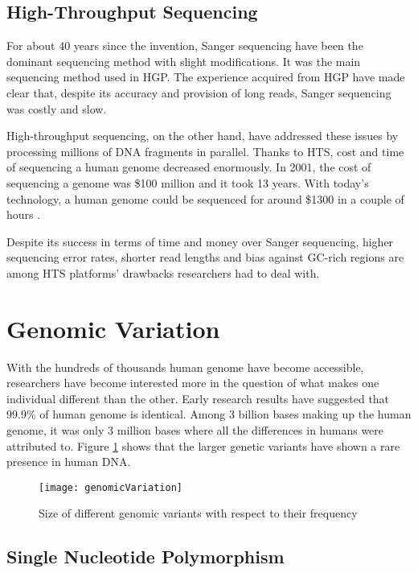 \subsection{High-Throughput Sequencing}
For about 40 years since the invention, Sanger sequencing have been the dominant sequencing method with slight modifications. It was the main sequencing method used in HGP. The experience acquired from HGP have made clear that, despite its accuracy and provision of long reads, Sanger sequencing was costly and slow.

High-throughput sequencing, on the other hand, have addressed these issues by processing millions of DNA fragments in parallel. Thanks to HTS, cost and time of sequencing a human genome decreased enormously. In 2001, the cost of sequencing a genome was \$100 million and it took 13 years. With today's technology, a human genome could be sequenced for around \$1300 \cite{costOfHumanGenomeProject} in a couple of hours \cite{timeEstimatesPerRun}.

Despite its success in terms of time and money over Sanger sequencing, higher sequencing error rates, shorter read lengths and bias against GC-rich regions \cite{smith2008rapid} are among HTS platforms' drawbacks researchers had to deal with. 

\section{Genomic Variation}

With the hundreds of thousands human genome have become accessible, researchers have become interested more in the question of what makes one individual different than the other. Early research results have suggested that 99.9\% of human genome is identical. Among 3 billion bases making up the human genome, it was only 3 million bases where all the differences in humans were attributed to. Figure \ref{geneticVariants} shows that the larger genetic variants have shown a rare presence in human DNA.

\begin{figure}[ht]
\centering
\texttt{[image: genomicVariation]}
\caption{Size of different genomic variants with respect to their frequency}
\label{geneticVariants}
\end{figure}



\subsection{Single Nucleotide Polymorphism}



